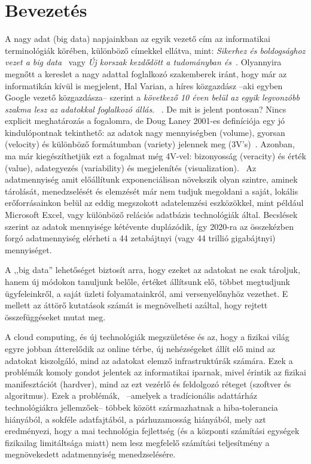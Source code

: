 \documentclass[a4paper,12pt]{article}
\author{Belényesi Roland}
\begin{document}
\section{Bevezetés}
A nagy adat (big data) napjainkban az egyik vezető cím az informatikai terminológiák körében, különböző címekkel ellátva, mint: 
\textsl{Sikerhez és boldogsághoz vezet a big data}~\cite{ori} vagy 
\textsl{Új korszak kezdődött a tudományban és}~\cite{oria}. Olyannyira megnőtt a kereslet a nagy adattal foglalkozó szakemberek iránt, hogy már az informatikán kívül is megjelent, Hal Varian, a híres közgazdász --aki egyben Google vezető közgazdásza-- szerint a \textsl{következő 10 éven belül az egyik legvonzóbb szakma lesz az adatokkal foglalkozó állás}. ~\cite{varian}. De mit is jelent pontosan? Nincs explicit meghatározás a fogalomra, de Doug Laney 2001-es definíciója egy jó kindulópontnak tekinthető: az adatok nagy mennyiségben (volume), gyorsan (velocity) és különböző formátumban (variety) jelennek meg (3V's)~\cite{3v}. Azonban, ma már kiegészíthetjük ezt a fogalmat még 4V-vel: bizonyosság (veracity) és érték (value), adategyezés (variability) és megjelenítés (visualization).~\cite{7v} Az adatmennyiség amit előállítunk exponenciálisan növekszik olyan szintre, aminek tárolását, menedzselését és elemzését már nem tudjuk megoldani a saját, lokális erőforrásainkon belül az eddig megszokott adatelemzési eszközökkel, mint például Microsoft Excel, vagy különböző relációs adatbázis technológiák által.
Becslések~\cite{2020} szerint az adatok mennyisége kétévente duplázódik, így 2020-ra az összekézben forgó adatmennyiség elérheti a 44 zetabájtnyi (vagy 44 trillió gigabájtnyi) mennyiséget.
\linebreak

A ,,big data'' lehetőséget biztosít arra, hogy ezeket az adatokat ne csak tároljuk, hanem új módokon tanuljunk belőle, értéket állítsunk elő, többet megtudjunk ügyfeleinkről, a saját üzleti folyamatainkról, ami versenyelőnyhöz vezethet. E mellett az áttörő kutatások számát is megnövelheti azáltal, hogy rejtett összefüggéseket mutat meg.~\cite{brk} 

A cloud computing, és új technológiák megszületése és az, hogy a fizikai világ egyre jobban átterelődik az online térbe, új nehézségeket állít elő mind az adatokat kiszolgáló, mind az adatokat elemző infrastruktúrák számára. Ezek a problémák komoly gondot jelentek az informatikai iparnak, mivel érintik az fizikai manifesztációt (hardver), mind az ezt vezérlő és feldolgozó réteget (szoftver és algoritmus). Ezek a problémák,~\cite{dst} --amelyek a tradícionális adattárház technológiákra jellemzőek-- többek között származhatnak a hiba-tolerancia hiányából, a sokféle adatfajtából, a párhuzamosság hiányából, mely azt eredményezi, hogy a mai technológia fejlettség (és a központi számítási egységek fizikailag limitáltsága miatt) nem lesz megfelelő számítási teljesítmény a megnövekedett adatmennyiség menedzselésére.
\end{document}
